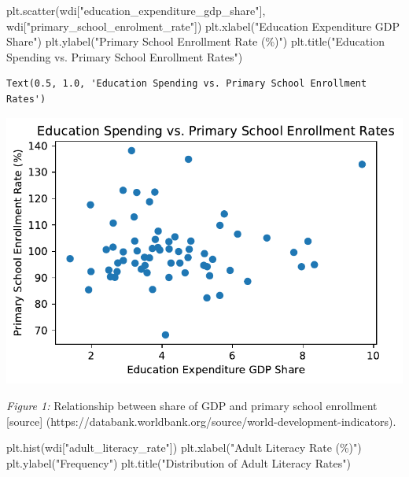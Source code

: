 \documentclass[
  letterpaper,
  DIV=11,
  numbers=noendperiod]{scrartcl}
\newenvironment{Shaded}{\begin{snugshade}}{\end{snugshade}}
\newcommand{\NormalTok}[1]{\textcolor[rgb]{0.00,0.23,0.31}{#1}}
\newcommand{\StringTok}[1]{\textcolor[rgb]{0.13,0.47,0.30}{#1}}
\begin{document}
\begin{Shaded}
\begin{Highlighting}[]
\NormalTok{plt.scatter(wdi[}\StringTok{"education\_expenditure\_gdp\_share"}\NormalTok{], wdi[}\StringTok{"primary\_school\_enrolment\_rate"}\NormalTok{])}
\NormalTok{plt.xlabel(}\StringTok{"Education Expenditure GDP Share"}\NormalTok{)}
\NormalTok{plt.ylabel(}\StringTok{"Primary School Enrollment Rate (\%)"}\NormalTok{)}
\NormalTok{plt.title(}\StringTok{"Education Spending vs. Primary School Enrollment Rates"}\NormalTok{)}
\end{Highlighting}
\end{Shaded}

\begin{verbatim}
Text(0.5, 1.0, 'Education Spending vs. Primary School Enrollment Rates')
\end{verbatim}

\includegraphics{assignment5_files/figure-pdf/cell-4-output-2.pdf}

\emph{Figure 1:} Relationship between share of GDP and primary school
enrollment {[}source{]}
(https://databank.worldbank.org/source/world-development-indicators).

\begin{Shaded}
\begin{Highlighting}[]
\NormalTok{plt.hist(wdi[}\StringTok{"adult\_literacy\_rate"}\NormalTok{])}
\NormalTok{plt.xlabel(}\StringTok{"Adult Literacy Rate (\%)"}\NormalTok{)}
\NormalTok{plt.ylabel(}\StringTok{"Frequency"}\NormalTok{)}
\NormalTok{plt.title(}\StringTok{"Distribution of Adult Literacy Rates"}\NormalTok{)}
\end{Highlighting}
\end{Shaded}
\end{document}
